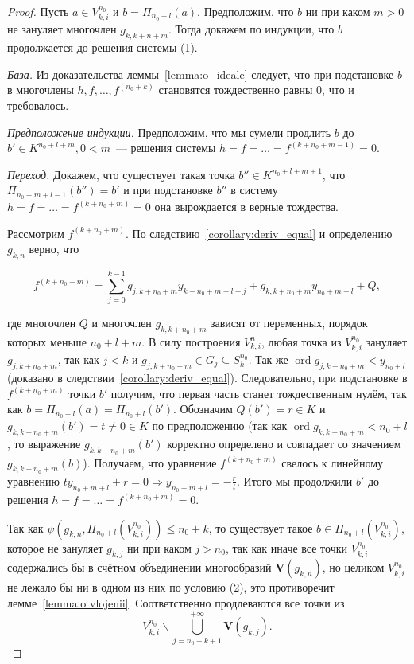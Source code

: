 \documentclass[16pt]{article}
\DeclareMathOperator{\ord}{ord}
\renewcommand{\le}{\leqslant} %
\theoremstyle{plain1}
\theoremstyle{plain2}
\theoremstyle{plain}
\theoremstyle{plain3}
\theoremstyle{definition}
\theoremstyle{remark}
\begin{document}
\begin{proof}
Пусть $a\in {V}_{k,i}^{n_0}$ и $b=\Pi_{n_0+l}(a)$. Предположим, что $b$ ни при каком $m>0$ не зануляет многочлен $g_{k,k+n+m}$. Тогда докажем по индукции, что $b$ продолжается до решения системы (1).

\emph{База.} Из доказательства леммы~\ref{lemma:o_ideale} следует, что при подстановке $b$ в многочлены $h,f,\ldots,f^{(n_0+k)}$ становятся тождественно равны 0, что и требовалось.

\emph{Предположение индукции.} Предположим, что мы сумели продлить $b$ до $b'\in K^{n_0+l+m}, 0< m$~--- решения системы $h=f=\ldots=f^{(k+n_0+m-1)}=0$.

\emph{Переход.} Докажем, что существует такая точка $b''\in K^{n_0+l+m+1}$, что $\Pi_{n_0+m+l-1}(b'')=b'$ и при подстановке $b''$ в систему $h=f=\ldots=f^{(k+n_0+m)}=0$ она вырождается в верные тождества.

Рассмотрим $f^{(k+n_0+m)}$. По следствию~\ref{corollary:deriv_equal} и определению $g_{k,n}$ верно, что

$$
f^{(k+n_0+m)}=\sum\limits_{j=0}^{k-1} g_{j,k+n_0+m}y_{k+n_0+m+l -j}+g_{k,k+n_0+m}y_{n_0+m+l}  + Q,
$$

где многочлен $Q$ и многочлен $g_{k,k+n_0+m}$ зависят от переменных, порядок которых меньше $n_0+l+m$. В силу построения ${V}_{k,i}^n$, любая точка из ${V}_{k,i}^{n_0}$ зануляет $g_{j,k+n_0+m}$, так как $j < k$ и $g_{j,k+n_0+m}\in G_j\subseteq S_k^{n_0}$. Так же $\ord g_{j,k+n_0+m}<y_{n_0+l}$ (доказано в следствии~\ref{corollary:deriv_equal}). Следовательно, при подстановке в $f^{(k+n_0+m)}$ точки $b'$ получим, что первая часть станет тождественным нулём, так как $b=\Pi_{n_0+l}(a)=\Pi_{n_0+l}(b')$. Обозначим $Q(b')=r\in K$ и $g_{k,k+n_0+m}(b')=t\neq 0\in K$ по предположению (так как $\ord g_{k,k+n_0+m}< n_0+l$, то выражение $g_{k,k+n_0+m}(b')$ корректно определено и совпадает со значением $g_{k,k+n_0+m}(b)$). Получаем, что уравнение $f^{(k+n_0+m)}$ свелось к линейному уравнению $t y_{n_0+m+l}+r=0\Rightarrow y_{n_0+m+l}=-\frac{r}{t}$. Итого мы продолжили $b'$ до решения $h=f=\ldots=f^{(k+n_0+m)}=0$.

 Так как $\psi(g_{k,n},\Pi_{n_0+l}({V}_{k,i}^{n_0}))\le n_0+k$, то существует такое $b\in \Pi_{n_0+l}({V}_{k,i}^{n_0})$,  которое не зануляет $g_{k,j}$ ни при каком $j>n_0$, так как иначе все точки ${V}_{k,i}^{n_0}$ содержались бы в счётном объединении многообразий $\mathbf{V}(g_{k,n})$, но целиком ${V}_{k,i}^{n_0}$ не лежало бы ни в одном из них по условию (2), это противоречит лемме~\ref{lemma:o vlojenii}. Соответственно продлеваются все точки из $${V}_{k,i}^{n_0}\backslash \bigcup\limits_{j=n_0+k+1}^{+\infty}\mathbf{V}(g_{k,j}).$$
 \end{proof}
\end{document}
